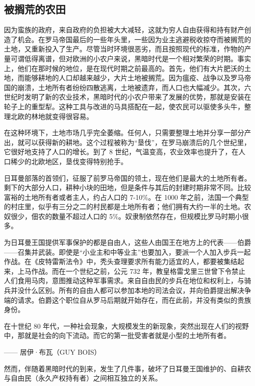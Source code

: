 \subsection{被搁荒的农田}
因为蛮族的政府，来自政府的负担被大大减轻，这就为穷人自由获得和持有财产创造了机会。在罗马帝国最后的一些年头里，一些因为业主逃避税收掠夺而被搁荒的土地，又重新投入了生产。尽管当时环境很恶劣，而且按照现代的标准，作物的产量可谓低得离谱，但对欧洲的小农户来说，黑暗时代是一个相对繁荣的时期。事实上，他们在那时候的地位，是在现代时期之前最高的。首先，他们有大片肥沃的土地，而能够耕地的人口却越来越少，大片土地被搁荒。因为瘟疫、战争以及罗马帝国的崩溃，土地所有者纷纷四散逃离，土地被遗弃，而人口也大幅减少。其次，六世纪时发明了新的农业技术，黑暗时代的小农户带来了发展的优势，那就是安装在轮子上的重型犁。这种工具与改进的马具搭配在一起，使农民可以驱使多头牛，整理北欧的林地就变得很容易。

在这种环境下，土地市场几乎完全萎缩。任何人，只需要整理土地并分享一部分产出，就可以获得新的耕地。这个过程被称为“垦伐”，在罗马崩溃后的几个世纪里，它很好地支持了人口的增长。到了 8 世纪，气温变高，农业效率也提升了，在人口稀少的北欧地区，垦伐变得特别抢手。

日耳曼部落的首领们，征服了前罗马帝国的领土，现在他们是最大的土地所有者。剩下的大部分人口，耕种小块的田地，但是条件与其后的封建时期非常不同。比较富裕的土地所有者或者主人，约占人口的 7-10\%。在 1000 年之前，法国一个典型的村庄里，似乎有三分之二的村民都是土地所有者；他们拥有大约一半的土地。农奴很少，佃农的数量不超过人口的 5\%。奴隶制依然存在，但规模比罗马时期小很多。

为日耳曼王国提供军事保护的都是自由人，这些人由国王在地方上的代表——伯爵——召集并武装。即使是“小业主和中等业主”也要加入，要派一个人加入步兵一起作战。在《皮特雷斯法令》中，秃头查理要求所有能力适宜的人，都要被集结起来，上马作战。而在一个世纪之前，公元 732 年，教皇格雷戈里三世曾下令禁止人们食用马肉，意图推动这种军事需求。来自自由民的步兵在地位和权利上，与骑兵并没什么区别。所有的自由人都可以参加本地的司法会议，并向伯爵提出解决争端的请求。伯爵这个职位自从罗马后期就开始存在，而在此前，并没有类似的贵族身份。


\begin{tcolorbox}
\kaishu 在十世纪 80 年代，一种社会现象，大规模发生的新现象，突然出现在人们的视野中，那就是社会的向下流动。而它的第一批受害者就是小型的土地所有者。
\begin{flushright}
—— 居伊·布瓦（GUY BOIS）
\end{flushright}
\end{tcolorbox}

然而，伴随着黑暗时代的到来，发生了几件事，破坏了日耳曼王国维护的、自耕农与自由民（永久产权持有者）之间相互独立的关系。

